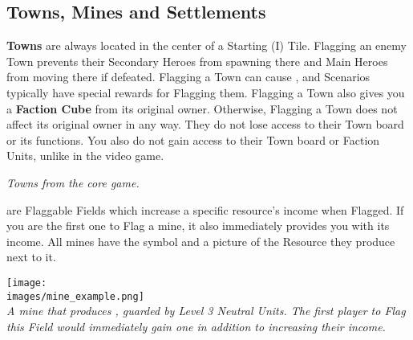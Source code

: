 \begin{multicols*}{2}
\vspace*{\fill}

\pagebreak

\subsection*{Towns, Mines and Settlements}
\textbf{Towns} are always located in the center of a Starting (I) Tile.
Flagging an enemy Town prevents their Secondary Heroes from spawning there and Main Heroes from moving there if defeated.
Flagging a Town can cause , and Scenarios typically have special rewards for Flagging them.
Flagging a Town also gives you a \textbf{Faction Cube} from its original owner.
Otherwise, Flagging a Town does not affect its original owner in any way.
They do not lose access to their Town board or its functions.
You also do not gain access to their Town board or Faction Units, unlike in the video game.

\begin{center}
  \textit{Towns from the core game.}
\end{center}

\medskip

 are Flaggable Fields which increase a specific resource's income when Flagged.
If you are the first one to Flag a mine, it also immediately provides you with its income.
All mines have the  symbol and a picture of the Resource they produce next to it.

\begin{center}
  \texttt{[image: \\images/mine\_example.png]}\\
  \textit{A mine that produces , guarded by Level 3 Neutral Units.
    The first player to Flag this Field would immediately gain one  in addition to increasing their  income.
  }
\end{center}
\columnbreak


\end{multicols*}
